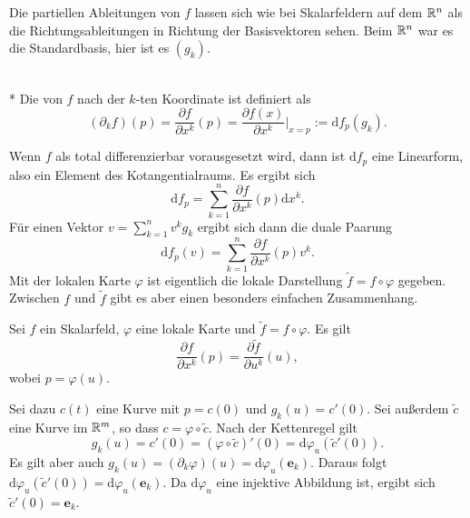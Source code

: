 Die partiellen Ableitungen von $f$ lassen sich wie bei Skalarfeldern
auf dem $\mathbb R^n$ als die Richtungsableitungen in Richtung der
Basisvektoren sehen. Beim $\mathbb R^n$ war es die Standardbasis, hier ist
es $(g_k)$.
\begin{definition}\mbox{}\\*
Die  von $f$ nach der $k$-ten Koordinate
ist definiert als
\begin{equation}\label{eq:partial}
(\partial_k f)(p) = \frac{\partial f}{\partial x^k}(p)
= \frac{\partial f(x)}{\partial x^k}\Big|_{x=p} :=
\mathrm df_p(g_k).
\end{equation}
\end{definition}
Wenn $f$ als total differenzierbar vorausgesetzt wird, dann ist
$\mathrm df_p$ eine Linearform, also ein Element des
Kotangentialraums. Es ergibt sich
\begin{equation}
\mathrm df_p = \sum_{k=1}^n \frac{\partial f}{\partial x^k}(p)\mathrm dx^k.
\end{equation}
Für einen Vektor $v=\sum_{k=1}^n v^k g_k$ ergibt
sich dann die duale Paarung
\begin{equation}
\mathrm df_p(v) = \sum_{k=1}^n \frac{\partial f}{\partial x^k}(p)v^k.
\end{equation}
Mit der lokalen Karte $\varphi$ ist eigentlich die lokale
Darstellung $\tilde f=f\circ\varphi$ gegeben. Zwischen
$f$ und $\tilde f$ gibt es aber einen besonders einfachen Zusammenhang.
\begin{corollary}
Sei $f$ ein Skalarfeld, $\varphi$ eine lokale Karte und
$\tilde f=f\circ\varphi$. Es gilt%
\begin{equation}
\frac{\partial f}{\partial x^k}(p) = \frac{\partial\tilde f}{\partial u^k}(u),
\end{equation}
wobei $p=\varphi(u)$.
\end{corollary}
 Sei dazu $c(t)$ eine Kurve mit $p=c(0)$ und
$g_k(u)=c'(0)$. Sei außerdem $\tilde c$ eine Kurve im $\mathbb R^m$, so dass
$c=\varphi\circ \tilde c$. Nach der Kettenregel gilt
\begin{equation}
g_k(u) = c'(0) = (\varphi\circ\tilde c)'(0) = \mathrm d\varphi_u(\tilde c'(0)).
\end{equation}
Es gilt aber auch $g_k(u) = (\partial_k\varphi)(u) =
\mathrm d\varphi_u(\mathbf e_k)$. Daraus folgt
$\mathrm d\varphi_u(\tilde c'(0)) = \mathrm d\varphi_u(\mathbf e_k)$.
Da $\mathrm d\varphi_u$ eine injektive Abbildung ist, ergibt sich
$\tilde c'(0) = \mathbf e_k$.\;\qedsymbol


